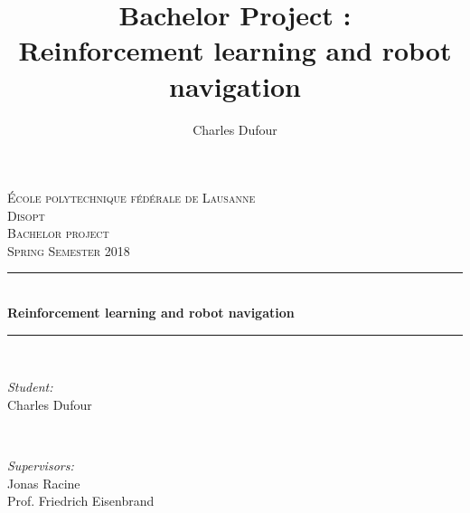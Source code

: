 \documentclass[14pt,a4paper]{article}
\author{Charles Dufour}
\title{Bachelor Project : \\
Reinforcement learning and robot navigation}
\theoremstyle{definition}
\begin{document}
\begin{titlepage}
\newcommand{\HRule}{\rule{\linewidth}{0.5mm}} %

\center %
 

\vspace{3cm}
\textsc{\LARGE \'Ecole polytechnique f\'ed\'erale de Lausanne}\\[0.5cm] %
\textsc{\large Disopt}\\[1.5cm] %
\textsc{\LARGE Bachelor project}\\[0.5cm] %
\textsc{\large Spring Semester 2018 }\\[0.5cm] %


\HRule \\[0.4cm]
{ \huge \bfseries Reinforcement learning and robot navigation}\\[0.4cm] %
\HRule \\[1.5cm]
 

\begin{minipage}{0.4\textwidth}
\begin{flushleft} \large
\emph{Student:}\\
Charles Dufour
\end{flushleft}
\end{minipage}
~
\begin{minipage}{0.4\textwidth}
\begin{flushright} \large
\emph{Supervisors:} \\
Jonas Racine\\%
Prof. Friedrich Eisenbrand 
\end{flushright}
\end{minipage}\\[5cm]


\end{titlepage}
\end{document}
